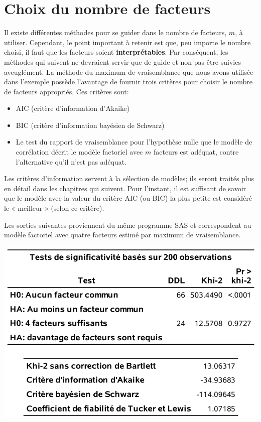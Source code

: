\documentclass[
  11pt,
  letterpaper,
]{book}
\providecommand{\tightlist}{%
  \setlength{\itemsep}{0pt}\setlength{\parskip}{0pt}}
\theoremstyle{definition}
\theoremstyle{definition}
\theoremstyle{definition}
\theoremstyle{remark}
\begin{document}
\hypertarget{choix-du-nombre-de-facteurs}{%
\section{Choix du nombre de facteurs}\label{choix-du-nombre-de-facteurs}}

Il existe différentes méthodes pour se guider dans le nombre de facteurs, \(m\), à utiliser. Cependant, le point important à retenir est que, peu importe le nombre choisi, il faut que les facteurs soient \textbf{interprétables}. Par conséquent, les méthodes qui
suivent ne devraient servir que de guide et non pas être suivies aveuglément.
La méthode du maximum de vraisemblance que nous avons utilisée dans l'exemple possède l'avantage de fournir trois critères pour choisir le nombre de facteurs appropriés. Ces critères sont:

\begin{itemize}
\tightlist
\item
  AIC (critère d'information d'Akaike)
\item
  BIC (critère d'information bayésien de Schwarz)
\item
  Le test du rapport de vraisemblance pour l'hypothèse nulle que le modèle de corrélation décrit le modèle factoriel avec \(m\) facteurs est adéquat, contre l'alternative qu'il n'est pas adéquat.
\end{itemize}

Les critères d'information servent à la sélection de modèles; ils seront traités plus en détail dans les chapitres qui suivent. Pour l'instant, il est suffisant de savoir que le modèle avec la valeur du critère AIC (ou BIC) la plus petite est considéré le « meilleur » (selon ce critère).

Les sorties suivantes proviennent du même programme SAS et correspondent au modèle factoriel avec quatre facteurs estimé par maximum de vraisemblance.

\begin{center}\includegraphics[width=0.7\linewidth]{figures/01-facto-e4} \end{center}
\end{document}
